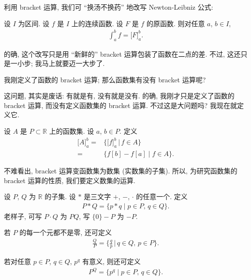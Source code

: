 利用 bracket 运算, 我们可 ``换汤不换药''
地改写 Newton-Leibniz 公式:

\begin{theorem}
    设 $I$ 为区间.
    设 $f$ 是 $I$ 上的连续函数.
    设 $F$ 是 $f$ 的原函数.
    则对任意 $a$, $b \in I$,
    \begin{align*}
        \int_{a}^{b} {f} = \big[ F \big]_{a}^{b}.
    \end{align*}
\end{theorem}

的确,
这个改写只是用 ``新鲜的'' bracket 运算包装了函数在二点的差.
不过, 这还只是一小步;
我马上就要迈一大步了.

我刚定义了函数的 bracket 运算;
那么函数集有没有 bracket 运算呢?

这问题, 其实是废话:
有就是有, 没有就是没有.
的确, 我刚才只是定义了函数的 bracket 运算,
而没有定义函数集的 bracket 运算.
不过这是大问题吗?
我现在就定义它.

\begin{definition}
    设 $A$ 是 $P \subset \mathbb{R}$ 上的函数集.
    设 $a$, $b \in P$. 定义
    \begin{align*}
        \big[ A \big]_{a}^{b}
        = {} & \bigg\{ \big[ f \big]_{a}^{b} \,\bigg|\, f \in A \bigg\} \\
        = {} & \{ f[b] - f[a] \mid f \in A \}.
    \end{align*}
\end{definition}

不难看出, bracket 运算变函数集为数集 (实数集的子集).
所以, 为研究函数集的 bracket 运算的性质, 我们要定义数集的运算.

\begin{definition}
    设 $P$, $Q$ 为 $\mathbb{R}$ 的子集.
    设 $\ast$ 是三文字 $+$, $-$, $\cdot$ 的任意一个.
    定义
    \begin{align*}
        P \ast Q = \{ p \ast q \mid \text{$p \in P$, $q \in Q$} \}.
    \end{align*}
    老样子, 可写 $P \cdot Q$ 为 $PQ$,
    写 $\{ 0 \} - P$ 为 $-P$.

    若 $P$ 的每一个元都不是零, 还可定义
    \begin{align*}
        \frac{Q}{P} = \Bigg\{ \frac{q}{p} \,\Bigg|\,  \text{$q \in Q$, $p \in P$} \Bigg\}.
    \end{align*}

    若对任意 $p \in P$, $q \in Q$, $p^q$ 有意义, 则还可定义
    \begin{align*}
        P^Q = \{ p^q \mid \text{$p \in P$, $q \in Q$} \}.
    \end{align*}
\end{definition}


